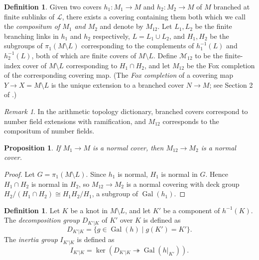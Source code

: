 \documentclass{amsart}
\theoremstyle{plain}
\theoremstyle{definition}
\newtheorem{Def}[theorem]{Definition}
\theoremstyle{plain}
\newtheorem{prop}[theorem]{Proposition}
\theoremstyle{plain}
\theoremstyle{plain}
\theoremstyle{remark}
\newtheorem{remark}[theorem]{Remark}
\theoremstyle{remark}
\theoremstyle{plain}
\theoremstyle{definition}
\theoremstyle{plain}
\DeclareMathOperator{\Gal}{\mathrm{Gal}}
\theoremstyle{plain}
\theoremstyle{plain}
\numberwithin{equation}{section}
\begin{document}
\begin{Def}
Given two covers $h_1:M_1\rightarrow M$ and $h_2:M_2\rightarrow M$ of $M$ branched at finite sublinks of $\mathcal{L}$, there exists a covering containing them both which we call the \emph{compositum of $M_1$ and $M_2$} and denote by $M_{12}$. Let $L_1, L_2$ be the finite branching links in $h_1$ and $h_2$ respectively, $L = L_1 \cup L_2$, and $H_1, H_2$ be the subgroups of $\pi_1(M \setminus L)$ corresponding to the complements of $h_1^{-1}(L)$ and $h_2^{-1}(L)$, both of which are finite covers of $M \setminus L$. Define $\mathcal{M}_{12}$ to be the finite-index cover of $M \setminus L$ corresponding to $H_1 \cap H_2$, and let $M_{12}$ be the Fox completion of the corresponding covering map. (The \emph{Fox completion} of a covering map $Y \to X = M \setminus L$ is the unique extension to a branched cover $N \to M$; see Section 2 of \cite{morishita2012knots}.) 
\end{Def}

\begin{remark}
In the arithmetic topology dictionary, branched covers correspond to number field extensions with ramification, and $M_{12}$ corresponds to the compositum of number fields.
\end{remark}

\begin{prop}
If $M_1\rightarrow M$ is a normal cover, then $M_{12} \to  M_2$ is a normal cover. 
\end{prop} 

\begin{proof}
Let $G=\pi_1(M\setminus L)$.
Since $h_1$ is normal, $H_1$ is normal in $G$. Hence $H_1 \cap H_2$ is normal in $H_2$, so $M_{12} \to M_2$ is a normal covering with deck group $H_2/(H_1 \cap H_2) \cong H_1H_2/H_1$, a subgroup of $\Gal(h_1)$. 
\end{proof}
\begin{Def}
Let $K$ be a knot in $M \setminus L$, and let $K'$ be a component of $h^{-1}(K)$. The \emph{decomposition group} $D_{K'|K}$ of $K'$ over $K$ is defined as 
\begin{equation}
    D_{K'|K} = \{g \in \Gal(h) \mid g(K') = K'\}.
\end{equation}
The \emph{inertia group} $I_{K'|K}$ is defined as 
\begin{equation}
    I_{K'|K} = \ker(D_{K'|K} \twoheadrightarrow \Gal(h|_{K'})).
\end{equation}
\end{Def}
\end{document}
